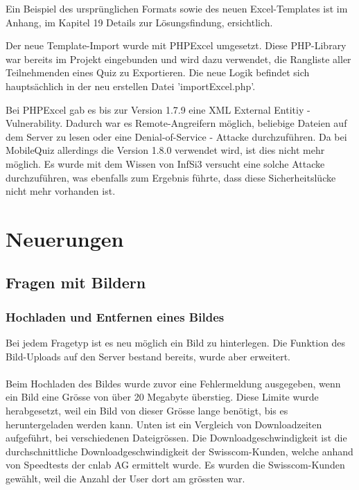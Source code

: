 Ein Beispiel des ursprünglichen Formats sowie des neuen Excel-Templates ist im Anhang, im Kapitel 19 Details zur Lösungsfindung, ersichtlich.

Der neue Template-Import wurde mit PHPExcel \cite{phpexcel} umgesetzt. Diese PHP-Library war bereits im Projekt eingebunden und wird dazu verwendet, die Rangliste aller Teilnehmenden eines Quiz zu Exportieren. Die neue Logik befindet sich hauptsächlich in der neu erstellen Datei 'importExcel.php'.

Bei PHPExcel gab es bis zur Version 1.7.9 eine \gls{XML External Entitiy} - \gls{Vulnerability}. Dadurch war es Remote-Angreifern möglich, beliebige Dateien auf dem Server zu lesen oder eine Denial-of-Service - Attacke durchzuführen. \cite{cvedetails_phpexcel} %
Da bei MobileQuiz allerdings die Version 1.8.0 verwendet wird, ist dies nicht mehr möglich. Es wurde mit dem Wissen von InfSi3 versucht eine solche Attacke durchzuführen, was ebenfalls zum Ergebnis führte, dass diese Sicherheitslücke nicht mehr vorhanden ist. %

\section{Neuerungen}

\subsection{Fragen mit Bildern}

\subsubsection{Hochladen und Entfernen eines Bildes}
Bei jedem Fragetyp ist es neu möglich ein Bild zu hinterlegen. Die Funktion des Bild-Uploads auf den Server bestand bereits, wurde aber erweitert.
\\
\\
Beim Hochladen des Bildes wurde zuvor eine Fehlermeldung ausgegeben, wenn ein Bild eine Grösse von über 20 Megabyte überstieg. Diese Limite wurde herabgesetzt, weil ein Bild von dieser Grösse lange benötigt, bis es heruntergeladen werden kann. Unten ist ein Vergleich von Downloadzeiten aufgeführt, bei verschiedenen Dateigrössen. Die Downloadgeschwindigkeit ist die durchschnittliche Downloadgeschwindigkeit der Swisscom-Kunden, welche anhand von Speedtests der cnlab AG \cite{cnlab_speedtest} ermittelt wurde. Es wurden die Swisscom-Kunden gewählt, weil die Anzahl der User dort am grössten war. \\

